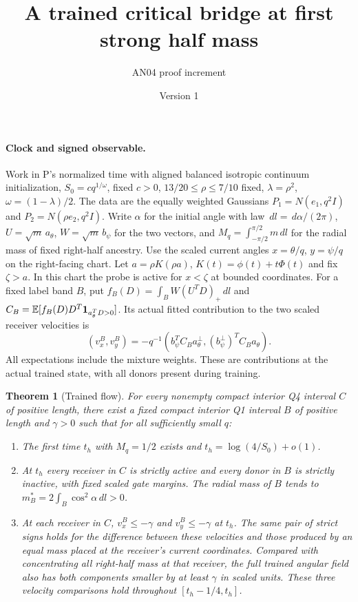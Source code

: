 \documentclass[11pt]{article}
\title{A trained critical bridge at first strong half mass}
\author{AN04 proof increment}\date{Version 1}
\newtheorem{theorem}{Theorem}\newtheorem{lemma}{Lemma}
\newcommand{\dd}{\,d}
\begin{document}
\maketitle

\paragraph{Clock and signed observable.}
Work in P's normalized time with aligned balanced isotropic continuum
initialization, $S_0=cq^{1/\omega}$, fixed $c>0$,
$13/20\le\rho\le7/10$ fixed, $\lambda=\rho^2$, $\omega=(1-\lambda)/2$.
The data are the equally weighted Gaussians
$P_1=N(e_1,q^2I)$ and $P_2=N(\rho e_2,q^2I)$.
Write $\alpha$ for the initial angle with law $\dd l=\dd\alpha/(2\pi)$,
$U=\sqrt m\,a_\theta$, $W=\sqrt m\,b_\psi$ for the two vectors,
and $M_q=\int_{-\pi/2}^{\pi/2}m\dd l$ for the radial mass of fixed
right-half ancestry. Use the scaled current angles $x=\theta/q$,
$y=\psi/q$ on the right-facing chart. Let $a=\rho K(\rho a)$,
$K(t)=\phi(t)+t\Phi(t)$ and fix $\zeta>a$.
In this chart the probe is active for $x<\zeta$ at bounded coordinates.
For a fixed label band $B$, put
$f_B(D)=\int_B W(U^TD)_+\dd l$ and
$C_B=\mathbb E[f_B(D)D^T{\bf1}_{a_\theta^TD>0}]$.
Its actual fitted contribution to the two scaled receiver velocities is
\[
  (v_x^B,v_y^B)=-q^{-1}
       (b_\psi^TC_Ba_\theta^\perp,(b_\psi^\perp)^TC_Ba_\theta).
\]
All expectations include the mixture weights. These are contributions
at the actual trained state, with all donors present during training.

\begin{theorem}[Trained flow]\label{an04hbdv1:main}
For every nonempty compact interior Q4 interval $C$ of positive length,
there exist a fixed compact interior Q1 interval $B$ of positive
length and $\gamma>0$ such that for all sufficiently small $q$:
\begin{enumerate}
\item The first time $t_h$ with $M_q=1/2$ exists and
$t_h=\log(4/S_0)+o(1)$.
\item At $t_h$ every receiver in $C$ is strictly active and every
donor in $B$ is strictly inactive, with fixed scaled gate margins.
The radial mass of $B$ tends to
$m_B^*=2\int_B\cos^2\alpha\dd l>0$.
\item At each receiver in $C$, $v_x^B\le-\gamma$ and
$v_y^B\le-\gamma$ at $t_h$. The same pair of strict signs holds for
the difference between these velocities and those produced by an
equal mass placed at the receiver's current coordinates.
Compared with concentrating \emph{all} right-half mass at that receiver,
the full trained angular field also has both components smaller by at
least $\gamma$ in scaled units. These three velocity comparisons hold
throughout $[t_h-1/4,t_h]$.
\end{enumerate}
\end{theorem}
\end{document}
